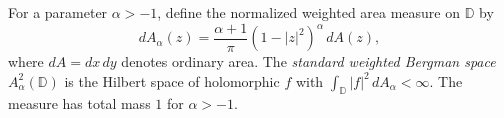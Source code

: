 
For a parameter $\alpha>-1$, define the normalized weighted area measure on $\mathbb D$ by
\[
dA_\alpha(z)=\frac{\alpha+1}{\pi}(1-|z|^2)^\alpha\,dA(z),
\]
where $dA=dx\,dy$ denotes ordinary area. The \emph{standard weighted Bergman space} $A_\alpha^2(\mathbb D)$ is the Hilbert space of holomorphic $f$ with $\int_{\mathbb D}|f|^2\,dA_\alpha<\infty$. The measure has total mass $1$ for $\alpha>-1$.
